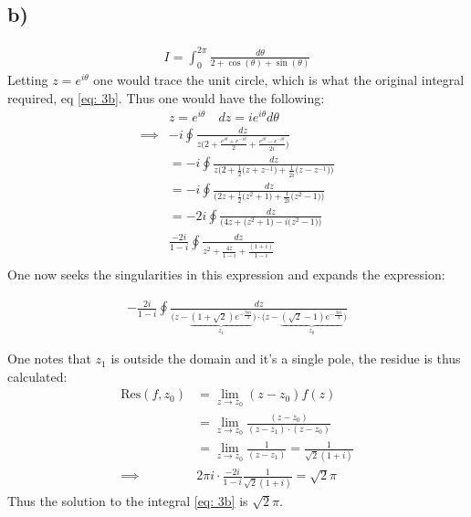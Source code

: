 \documentclass{article}
\newcommand{\res}[2]{\text{Res}(#1, #2)}
\begin{document}
\subsection*{b)}
\begin{align}
    I = \int_0^{2\pi}\frac{d\theta}{2 +\cos(\theta) + \sin(\theta)}\label{eq: 3b}
\end{align}
Letting $z = e^{i\theta}$ one would trace the unit circle, which is what the original integral required, eq \eqref{eq: 3b}. Thus one would have the following:
\begin{align*}
    &z = e^{i\theta}\quad dz = ie^{i\theta}d\theta\\
    \implies & -i\oint\frac{dz}{z\Big(2+\frac{e^{i\theta}+ e^{-i\theta}}{2} + \frac{e^{i\theta} - e^{-i\theta}}{2i}\Big)}\\
    &= -i\oint\frac{dz}{z\Big(2+\frac{1}{2}\big(z + z^{-1}\big)+\frac{1}{2i}\big(z-z^{-1}\big)\Big)}\\
    &= -i\oint\frac{dz}{\Big(2z+\frac{1}{2}\big(z^2 + 1\big)+\frac{1}{2i}\big(z^2-1\big)\Big)}\\
    &= -2i\oint\frac{dz}{\Big(4z+\big(z^2 + 1\big)-i\big(z^2-1\big)\Big)}\\
    & \frac{-2i}{1-i}\oint \frac{dz}{z^2 + \frac{4z}{1-i} + \frac{(1 + i)}{1-i}}\\
\end{align*}One now seeks the singularities in this expression and expands the expression:
\begin{comment}
\begin{align*}
    -2i\oint dz \left[\frac{1}{z - \underbrace{(1 - \frac{1}{\sqrt{2}} + i(-1 - \frac{1}{\sqrt{2}}))}_{z_1}}\right]\cdot\left[\frac{1}{z - \underbrace{(1 + \frac{1}{\sqrt{2}} + i(\frac{1}{\sqrt{2}} - 1))}_{z_0}}\right] 
\end{align*}
\end{comment}
\begin{align*}
    -\frac{2i}{1-i}\oint \frac{dz}{\Big(z -  \underbrace{(1 + \sqrt{2}) e^{-\frac{3\pi i }{4}}}_{z_1}\Big)\cdot\Big(z-\underbrace{(\sqrt{2} - 1)e^{-\frac{3\pi i}{4}}}_{z_0}\Big)}
\end{align*}

One notes that $z_1$ is outside the domain and it's a single pole, the residue is thus calculated:
\begin{align*} 
    \res{f}{z_0} &=\lim_{z\to z_0} (z - z_0)f(z)\\
    &=\lim_{z\to z_0}\frac{(z - z_0)}{(z - z_1)\cdot (z-z_0)}\\
    &=\lim_{z\to z_0}\frac{1}{(z - z_1)} = \frac{1}{\sqrt2(1+i)}\\
    \implies & 2\pi i \cdot \frac{-2i}{1-i}\frac{1}{\sqrt2(1+i)} = \sqrt{2}\pi
\end{align*}Thus the solution to the integral \eqref{eq: 3b} is $\sqrt{2}\pi$. 
\end{document}
